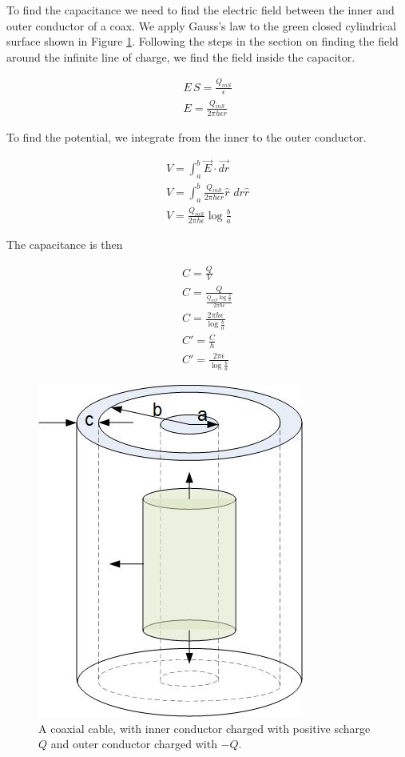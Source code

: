 \documentclass{ximera}
\begin{document}
 To find the capacitance we need to find the electric field between the inner and outer conductor of a coax. We apply Gauss's law to the green closed cylindrical surface shown in  Figure \ref{fig:coaxialCapacitorGaussInside}. Following the steps in the section on finding the field around the infinite line of charge, we find the field inside the capacitor.
 
 \begin{eqnarray}
 E \, S = \frac{Q_{inS}}{\epsilon} \\
 E=\frac{Q_{inS}}{2 \pi h \epsilon r }
 \end{eqnarray}
 
 To find the potential, we integrate from the inner to the outer conductor.
 
 
 \begin{eqnarray}
 V=\int_a^b \vec{E} \cdot \vec{dr} \\
 V = \int_a^b \frac{Q_{inS}}{2 \pi h \epsilon r } \hat{r} \, \,dr \hat{r} \\
 V=\frac{Q_{inS}}{2 \pi h \epsilon  } \log{\frac{b}{a}}
 \end{eqnarray}
 
 The capacitance is then
 
 \begin{eqnarray}
 C=\frac{Q}{V} \\
 C=\frac{Q}{\frac{Q_{inS} \log{\frac{b}{a}}}{2 \pi h \epsilon  }}\\
 C=\frac{2 \pi h \epsilon} {\log{\frac{b}{a}}} \\
 C'=\frac{C}{h} \\
 C'=\frac{2 \pi  \epsilon} {\log{\frac{b}{a}}}
 \end{eqnarray}

\begin{figure}[htbp]
\begin{center}
\includegraphics[scale=1]{../jpg/coax1.jpg}
\end{center}
\caption{A coaxial cable, with inner conductor charged with positive scharge $Q$ and outer conductor charged with $-Q.$}
\label{fig:coaxialCapacitorGaussInside}
\end{figure}
\end{document}
